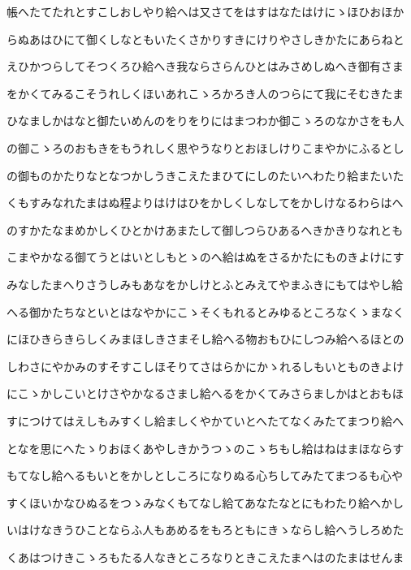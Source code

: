 \documentclass[a4paper,11pt,landscape]{ltjtarticle}
\begin{document}
帳へたてたれとすこしおしやり給へは又さてをはすはなたはけにゝほひおほか
\par\medskip
らぬあはひにて御くしなともいたくさかりすきにけりやさしきかたにあらねと
\par\medskip
えひかつらしてそつくろひ給へき我ならさらんひとはみさめしぬへき御有さま
\par\medskip
をかくてみるこそうれしくほいあれこゝろかろき人のつらにて我にそむきたま
\par\medskip
ひなましかはなと御たいめんのをりをりにはまつわか御こゝろのなかさをも人
\par\medskip
の御こゝろのおもきをもうれしく思やうなりとおほしけりこまやかにふるとし
\par\medskip
の御ものかたりなとなつかしうきこえたまひてにしのたいへわたり給またいた
\par\medskip
くもすみなれたまはぬ程よりはけはひをかしくしなしてをかしけなるわらはへ
\par\medskip
のすかたなまめかしくひとかけあまたして御しつらひあるへきかきりなれとも
\par\medskip
こまやかなる御てうとはいとしもとゝのへ給はぬをさるかたにものきよけにす
\par\medskip
みなしたまへりさうしみもあなをかしけとふとみえてやまふきにもてはやし給
\par\medskip
へる御かたちなといとはなやかにこゝそくもれるとみゆるところなくゝまなく
\par\medskip
にほひきらきらしくみまほしきさまそし給へる物おもひにしつみ給へるほとの
\par\medskip
しわさにやかみのすそすこしほそりてさはらかにかゝれるしもいとものきよけ
\par\medskip
にこゝかしこいとけさやかなるさまし給へるをかくてみさらましかはとおもほ
\par\medskip
すにつけてはえしもみすくし給ましくやかていとへたてなくみたてまつり給へ
\par\medskip
となを思にへたゝりおほくあやしきかうつゝのこゝちもし給はねはまほならす
\par\medskip
もてなし給へるもいとをかしとしころになりぬる心ちしてみたてまつるも心や
\par\medskip
すくほいかなひぬるをつゝみなくもてなし給てあなたなとにもわたり給へかし
\par\medskip
いはけなきうひことならふ人もあめるをもろともにきゝならし給へうしろめた
\par\medskip
くあはつけきこゝろもたる人なきところなりときこえたまへはのたまはせんま
\par\medskip
\end{document}
